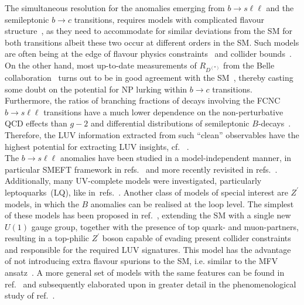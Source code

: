 The simultaneous resolution for the anomalies emerging from $ b \to s \ell \ell$ and the semileptonic $b \to c$ transitions, requires models with complicated flavour structure~\cite{DiLuzio:2017vat,Calibbi:2017qbu,Bordone:2017bld,Barbieri:2017tuq,Assad:2017iib,Heeck:2018ntp,Fornal:2018dqn,Crivellin:2018yvo,Crivellin:2019dwb,Bordone:2019uzc}, as they need to accommodate for similar deviations from the SM for both transitions albeit these two occur at different orders in the SM. Such models are often being at the edge of flavour physics constraints~\cite{Bona:2007vi,Silvestrini:2018dos} and collider bounds~\cite{Greljo:2017vvb,Baker:2019sli}.
On the other hand, most up-to-date measurements of $R_{D^{(*)}}$ from the Belle collaboration~\cite{Hirose:2016wfn,Abdesselam:2019dgh} turns out to be in good agreement with the SM~\cite{Bigi:2016mdz,Bernlochner:2017jka,Bigi:2017jbd,Jaiswal:2017rve}, thereby casting some doubt on the potential for NP lurking within $b\to c$ transitions. 
Furthermore, the ratios of branching fractions of decays involving the FCNC $b \to s \ell \ell$ transitions have a much lower dependence on the  non-perturbative QCD effects than $g-2$ and differential distributions of semileptonic $B$-decays~\cite{Capdevila:2016ivx,Serra:2016ivr,Wehle:2016yoi,Alguero:2019pjc}. Therefore, the LUV information extracted from such ``clean'' observables have the highest potential for extracting LUV insights, cf. ~\cite{Kou:2018nap}.\\
The  $ b \to s \ell \ell$ anomalies have been studied in a model-independent manner, in particular SMEFT framework in refs.~\cite{DAmico:2017mtc,Geng:2017svp,Capdevila:2017bsm,Ciuchini:2017mik,Hiller:2017bzc} and more recently revisited in refs.~\cite{Ciuchini:2019usw,Aebischer:2019mlg,Alok:2019ufo,Alguero:2019ptt,Kowalska:2019ley,Arbey:2019duh,Datta:2019zca}.  Additionally, many UV-complete models were investigated, particularly leptoquarks~(LQ), like in~refs.~\cite{Calibbi:2015kma,Dorsner:2016wpm,Buttazzo:2017ixm,Kumar:2018kmr,Cornella:2019hct}. Another class of models of special interest are $Z^\prime$ models, in which the $B$ anomalies can be realised at the loop level. The simplest of these models has been proposed in ref.~\cite{Kamenik:2017tnu}, extending the SM with a single new $U(1)$ gauge group, together with the presence of top quark- and muon-partners, resulting in a top-philic $Z^\prime$ boson capable of evading present collider constraints~\cite{Fox:2018ldq} and responsible for the required LUV signatures. This model has the advantage of not introducing extra flavour spurions to the SM, i.e. similar to the MFV ansatz~\cite{Buras:2000dm,DAmbrosio:2002vsn,Kagan:2009bn}.  A more general set of models with the same features can be found in ref.~\cite{Celis:2017doq} and subsequently elaborated upon in greater detail in the phenomenological study of ref.~\cite{Camargo-Molina:2018cwu}. \\
